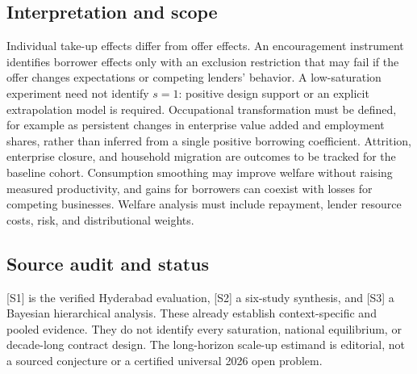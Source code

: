 \documentclass[11pt,a4paper]{article}
\begin{document}
\subsection*{Interpretation and scope}
Individual take-up effects differ from offer effects. An encouragement instrument identifies borrower effects only with an exclusion restriction that may fail if the offer changes expectations or competing lenders' behavior. A low-saturation experiment need not identify $s=1$: positive design support or an explicit extrapolation model is required. Occupational transformation must be defined, for example as persistent changes in enterprise value added and employment shares, rather than inferred from a single positive borrowing coefficient. Attrition, enterprise closure, and household migration are outcomes to be tracked for the baseline cohort. Consumption smoothing may improve welfare without raising measured productivity, and gains for borrowers can coexist with losses for competing businesses. Welfare analysis must include repayment, lender resource costs, risk, and distributional weights.
\subsection*{Source audit and status}
[S1] is the verified Hyderabad evaluation, [S2] a six-study synthesis, and [S3] a Bayesian hierarchical analysis. These already establish context-specific and pooled evidence. They do not identify every saturation, national equilibrium, or decade-long contract design. The long-horizon scale-up estimand is editorial, not a sourced conjecture or a certified universal 2026 open problem.
\end{document}
